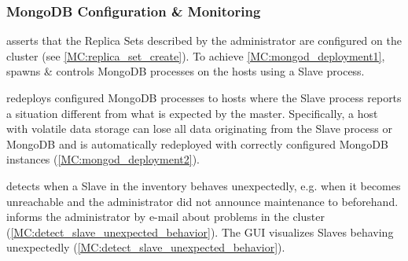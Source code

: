 \subsubsection{MongoDB Configuration \& Monitoring}
\begin{description}
	 \mamid asserts that the Replica Sets described by the administrator are configured on the cluster 
	(see \ref{MC:replica_set_create}). \done
	 To achieve \ref{MC:mongod_deployment1}, \mamid spawns \& controls MongoDB processes on the hosts 
	using a Slave process. \done
	\begin{description}
		 \mamid redeploys configured MongoDB processes to hosts where the Slave process reports 
		a situation different from what is expected by the master. \done
		 Specifically, a host with volatile data storage can lose all data originating 
		from the Slave process or MongoDB and is automatically redeployed with correctly configured MongoDB instances 
		(\ref{MC:mongod_deployment2}). \done
	\end{description}
	
	 \mamid detects when a Slave in the inventory behaves unexpectedly, e.g. when 
	it becomes unreachable and the administrator did not announce maintenance to \mamid beforehand. \done
	 \mamid informs the administrator by e-mail about problems in the cluster 
	(\ref{MC:detect_slave_unexpected_behavior}). \done
	 The GUI visualizes Slaves behaving unexpectedly (\ref{MC:detect_slave_unexpected_behavior}). \done
\end{description}

